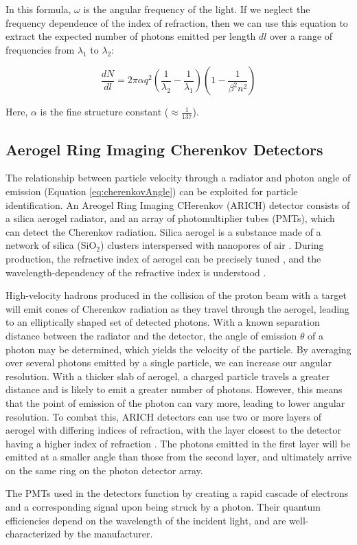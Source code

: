 In this formula, $\omega$ is the angular frequency of the light. If we neglect the frequency dependence of the index of refraction, then we can use this equation to extract the expected number of photons emitted per length $dl$ over a range of frequencies from $\lambda_1$ to $\lambda_2$:

\begin{equation}
    \label{eq:photonNumber}
    \frac{dN}{dl}  = 2\pi\alpha q^2 \left(\frac{1}{\lambda_2} - \frac{1}{\lambda_1}
    \right)\left(1 - \frac{1}{\beta^2n^2}\right)
\end{equation}

Here, $\alpha$ is the fine structure constant ($\approx \frac{1}{137}$).



\subsection{Aerogel Ring Imaging Cherenkov Detectors}
\label{sec:ARICH}
The relationship between particle velocity through a radiator and photon angle of emission (Equation \ref{eq:cherenkovAngle}) can be exploited for particle identification. An Areogel Ring Imaging CHerenkov (ARICH) detector consists of a silica aerogel radiator, and an array of photomultiplier tubes (PMTs), which can detect the Cherenkov radiation. Silica aerogel is a substance made of a network of silica (SiO$_2$) clusters interspersed with nanopores of air \cite{aerogelRefraction}. During production, the refractive index of aerogel can be precisely tuned \cite{aerogelRefraction}, and the wavelength-dependency of the refractive index is  understood \cite{aerogelWavelength}. 

High-velocity hadrons produced in the collision of the proton beam with a target will emit cones of Cherenkov radiation as they travel through the aerogel, leading to an elliptically shaped set of detected photons. With a known separation distance between the radiator and the detector, the angle of emission $\theta$ of a photon may be determined, which yields the velocity of the particle. By averaging over several photons emitted by a single particle, we can increase our angular resolution. With a thicker slab of aerogel, a charged particle travels a greater distance and is likely to emit a greater number of photons. However, this means that the point of emission of the photon can vary more, leading to lower angular resolution. To combat this, ARICH detectors can use two or more layers of aerogel with differing indices of refraction, with the layer closest to the detector having a higher index of refraction \cite{belleArich}. The photons emitted in the first layer will be emitted at a smaller angle than those from the second layer, and ultimately arrive on the same ring on the photon detector array.

The PMTs used in the detectors function by creating a rapid cascade of electrons and a corresponding signal upon being struck by a photon. Their quantum efficiencies depend on the wavelength of the incident light, and are well-characterized by the manufacturer.



\endinput

Any text after an \endinput is ignored.
You could put scraps here or things in progress.
